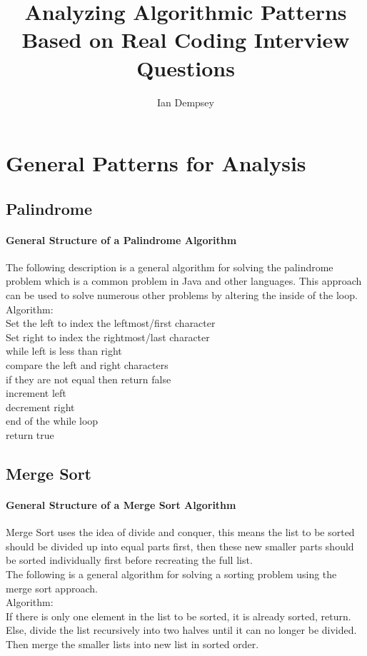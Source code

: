 \documentclass[twocolumn]{article}
\title{Analyzing Algorithmic Patterns Based on Real Coding Interview Questions}
\author{Ian Dempsey}
\begin{document}
\maketitle
{}
\newpage
{}

\section{General Patterns for Analysis}
\subsection{Palindrome}
\paragraph{General Structure of a Palindrome Algorithm}
The following description is a general algorithm for solving the palindrome problem which is a common problem in Java and other languages. This approach can be used to solve numerous other problems by altering the inside of the loop.\\
Algorithm:\\
Set the left to index the leftmost/first character\\
Set right to index the rightmost/last character\\
while left is less than right\\
\hspace*{0.5in}	compare the left and right characters\\
\hspace*{0.5in}	if they are not equal then return false\\
\hspace*{0.5in}	increment left\\
\hspace*{0.5in}	decrement right\\
end of the while loop\\
return true 

\subsection{Merge Sort}
\paragraph{General Structure of a Merge Sort Algorithm}
Merge Sort uses the idea of divide and conquer, this means the list to be sorted should be divided up into equal parts first, then these new smaller parts should be sorted individually first before recreating the full list.\\
The following is a general algorithm for solving a sorting problem using the merge sort approach. \\
Algorithm:\\
If there is only one element in the list to be sorted, it is already sorted, return.\\
Else, divide the list recursively into two halves until it can no longer be divided.\\
Then merge the smaller lists into new list in sorted order.\\
\end{document}
